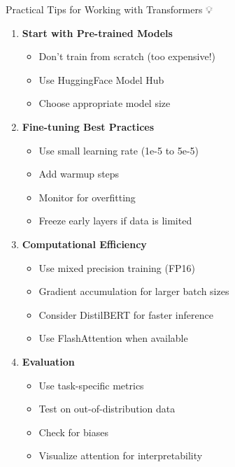 \documentclass[aspectratio=169]{beamer}
\begin{document}
\begin{frame}[shrink=10]{Practical Tips for Working with Transformers 💡}
\begin{enumerate}\setlength{\itemsep}{0pt}
    \item \textbf{Start with Pre-trained Models}
    \begin{itemize}\setlength{\itemsep}{0pt}
        \item Don't train from scratch (too expensive!)
        \item Use HuggingFace Model Hub
        \item Choose appropriate model size
    \end{itemize}

    \item \textbf{Fine-tuning Best Practices}
    \begin{itemize}\setlength{\itemsep}{0pt}
        \item Use small learning rate (1e-5 to 5e-5)
        \item Add warmup steps
        \item Monitor for overfitting
        \item Freeze early layers if data is limited
    \end{itemize}

    \item \textbf{Computational Efficiency}
    \begin{itemize}\setlength{\itemsep}{0pt}
        \item Use mixed precision training (FP16)
        \item Gradient accumulation for larger batch sizes
        \item Consider DistilBERT for faster inference
        \item Use FlashAttention when available
    \end{itemize}

    \item \textbf{Evaluation}
    \begin{itemize}\setlength{\itemsep}{0pt}
        \item Use task-specific metrics
        \item Test on out-of-distribution data
        \item Check for biases
        \item Visualize attention for interpretability
    \end{itemize}
\end{enumerate}
\end{frame}
\end{document}

